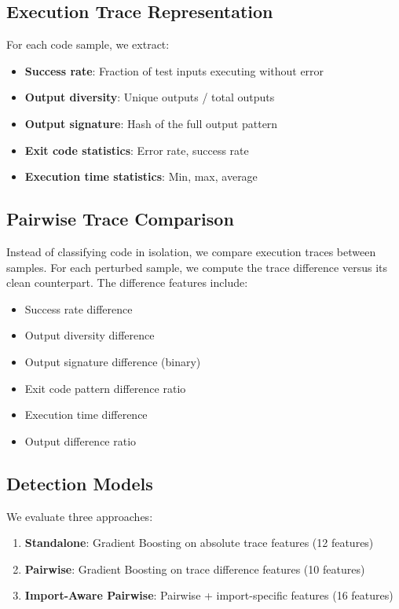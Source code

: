 \documentclass[conference]{IEEEtran}
\begin{document}
\subsection{Execution Trace Representation}
\label{sec:traces}

For each code sample, we extract:
\begin{itemize}
    \item \textbf{Success rate}: Fraction of test inputs executing without error
    \item \textbf{Output diversity}: Unique outputs / total outputs
    \item \textbf{Output signature}: Hash of the full output pattern
    \item \textbf{Exit code statistics}: Error rate, success rate
    \item \textbf{Execution time statistics}: Min, max, average
\end{itemize}

\subsection{Pairwise Trace Comparison}
\label{sec:pairwise}

Instead of classifying code in isolation, we compare execution traces between samples. For each perturbed sample, we compute the trace difference versus its clean counterpart. The difference features include:

\begin{itemize}
    \item Success rate difference
    \item Output diversity difference
    \item Output signature difference (binary)
    \item Exit code pattern difference ratio
    \item Execution time difference
    \item Output difference ratio
\end{itemize}

\subsection{Detection Models}
\label{sec:models}

We evaluate three approaches:
\begin{enumerate}
    \item \textbf{Standalone}: Gradient Boosting on absolute trace features (12 features)
    \item \textbf{Pairwise}: Gradient Boosting on trace difference features (10 features)
    \item \textbf{Import-Aware Pairwise}: Pairwise + import-specific features (16 features)
\end{enumerate}
\end{document}
